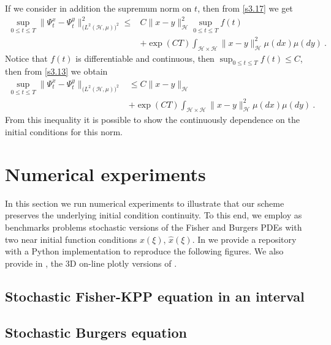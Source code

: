 \documentclass[review, onefignum, onetabnum]{siamart171218}
\begin{document}
\begin{remark}
    If we consider in addition the supremum norm on $t$, then from
    \eqref{s3.17} we get
    \begin{equation}
        \label{s3.13}
        \begin{aligned}
            \sup_{0\le t\le T}\| \Psi_t^x-\Psi_t^y\|_{
                \big(L^2(\mathcal{H},\mu) \big)^2} ^ 2
                \le&
                 C \| x-y\|_{\mathcal{H}}^2
                 \sup_{0\le t\le T} f(t)
                 \\
                 &+
                \exp(CT)
                \int_{\mathcal{H}\times \mathcal{H}}
                \|x-y\|_{\mathcal{H}}^2 \mu(dx)\mu(dy) \ .
        \end{aligned}
    \end{equation}
    Notice that $f(t)$ is differentiable and continuous, then
    $\sup_{0\le t\le T} f(t)\le C$, then from \eqref{s3.13} we obtain
    \begin{equation}
        \label{s3.14}
        \begin{aligned}
            \sup_{0\le t\le T}
            \|
                \Psi_t^x-\Psi_t^y
            \|_{\big(L^2(\mathcal{H},\mu)\big)^2}
            &\le
            C \| x-y\|_{\mathcal{H}}
            \\
            & +
            \exp(CT)
            \int_{\mathcal{H}\times \mathcal{H}}
            \| x-y\|_{\mathcal{H}}^2 \mu(dx)\mu(dy) \ .
        \end{aligned}
    \end{equation}
    From this inequality it is possible to show the continuously dependence on
    the initial conditions for this norm.
\end{remark}

\section{Numerical experiments}
        In this section we run numerical experiments to illustrate that our
    scheme preserves the underlying initial condition continuity. To 
    this end, we employ as benchmarks problems stochastic versions of the 
    Fisher and Burgers PDEs with two near initial function conditions $x(\xi)$, 
    $\widehat{x}(\xi)$. In \cite{matsumyaRepo} we provide a repository with a 
    Python implementation to reproduce the following figures. We also provide 
    in \cite{plotlyFisher, plotlyBurgers},
    the 3D on-line plotly versions of 
    .
%
    \subsection*{Stochastic Fisher-KPP equation in an interval}
        
    \subsection*{Stochastic Burgers equation}
        
    
    
\end{document}
